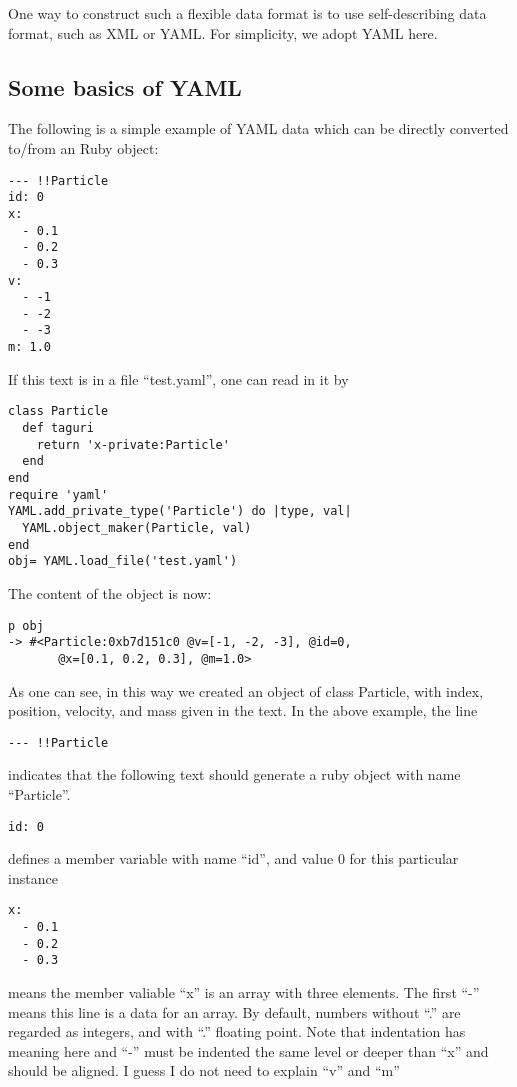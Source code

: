 \documentclass[12pt]{article}
\begin{document}
One way to construct such a flexible data format is to use
self-describing data format, such as XML or YAML. For simplicity,
we adopt YAML here.

\subsection{Some basics of YAML}

The following is a simple example of YAML data which can be directly
converted to/from an Ruby object:

\begin{verbatim}
--- !!Particle
id: 0
x:
  - 0.1
  - 0.2
  - 0.3
v:
  - -1
  - -2
  - -3
m: 1.0
\end{verbatim}

If this text is in a file ``test.yaml'', one can read in it by

\begin{verbatim}
class Particle
  def taguri
    return 'x-private:Particle'
  end
end
require 'yaml'
YAML.add_private_type('Particle') do |type, val|
  YAML.object_maker(Particle, val)
end
obj= YAML.load_file('test.yaml')
\end{verbatim}

The content of the object is now:
\begin{verbatim}
p obj
-> #<Particle:0xb7d151c0 @v=[-1, -2, -3], @id=0,
       @x=[0.1, 0.2, 0.3], @m=1.0>
\end{verbatim}

As one can see, in this way we created an object of class Particle,
with index, position, velocity, and mass given in the text. In the
above example, the line

\begin{verbatim}
--- !!Particle
\end{verbatim}
indicates that the following text should generate a ruby object with
name ``Particle''.

\begin{verbatim}
id: 0
\end{verbatim}
defines a member variable with name ``id'', and value 0 for this
particular instance
\begin{verbatim}
x:
  - 0.1
  - 0.2
  - 0.3
\end{verbatim}
means the member valiable ``x'' is an array with three elements. The
first ``-'' means this line is a data for an array.
By default, numbers without ``.'' are regarded as integers, and with
``.'' floating point. Note that indentation has meaning here and ``-''
must be indented the same level or deeper than ``x'' and should be aligned.
I guess I do not need to explain ``v'' and ``m''
\end{document}

